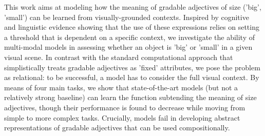 This work aims at modeling how the meaning of gradable adjectives of size ('big', 'small') can be learned from visually-grounded contexts. Inspired by cognitive and linguistic evidence showing that the use of these expressions relies on setting a threshold that is dependent on a specific context, we investigate the ability of multi-modal models in assessing whether an object is 'big' or 'small' in a given visual scene. In contrast with the standard computational approach that simplistically treats gradable adjectives as 'fixed' attributes, we pose the problem as relational: to be successful, a model has to consider the full visual context. By means of four main tasks, we show that state-of-the-art models (but not a relatively strong baseline) can learn the function subtending the meaning of size adjectives, though their performance is found to decrease while moving from simple to more complex tasks. Crucially, models fail in developing abstract representations of gradable adjectives that can be used compositionally.